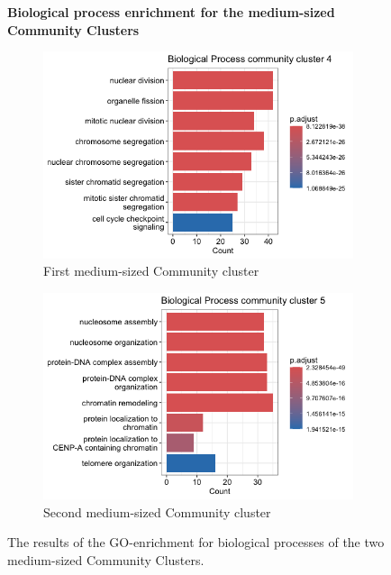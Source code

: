  \begin{figure}[hbt!]
 	\centering
 	\caption*{\textbf{Biological process enrichment for the medium-sized Community Clusters}}
		\begin{subfigure}{.49\textwidth}
			\centering
 			\includegraphics[width=\textwidth]{fig/Biological Process glay cluster 4.png}
 			\caption{First medium-sized Community cluster}
 		\end{subfigure}
    	\begin{subfigure}{.49\textwidth}
    		\centering
 			\includegraphics[width=\textwidth]{fig/Biological Process glay cluster 5.png}
 			\caption{Second medium-sized Community cluster}
 		\end{subfigure}
 	\caption{The results of the GO-enrichment for biological processes of the two medium-sized Community Clusters.}
 	\label{fig:medium-community-bp}
 \end{figure}
